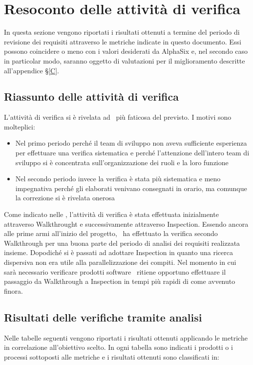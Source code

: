 \newpage
\section{Resoconto delle attività di verifica} \label{B}
In questa sezione vengono riportati i risultati ottenuti a termine del periodo di revisione dei requisiti attraverso le metriche indicate in questo documento. Essi possono coincidere o meno con i valori desiderati da AlphaSix e, nel secondo caso in particolar modo, saranno oggetto di valutazioni per il miglioramento descritte all'appendice \S\ref{C}.

    \subsection{Riassunto delle attività di verifica}
    L'attività di verifica si è rivelata ad \gruppo\ più faticosa del previsto. I motivi sono molteplici:
    	\begin{itemize}
    		\item Nel primo periodo perché il team di sviluppo non aveva sufficiente esperienza per effettuare una verifica sistematica e perché l'attenzione dell'intero team di sviluppo si è concentrata sull'organizzazione dei ruoli e la loro funzione
    		\item Nel secondo periodo invece la verifica è stata più sistematica e meno impegnativa perché gli elaborati venivano consegnati in orario, ma comunque la correzione si è rivelata onerosa
    	\end{itemize}
    

    Come indicato nelle \NdPd, l'attività di verifica è stata effettuata inizialmente attraverso Walkthrought e successivamente attraverso Inspection. Essendo ancora alle prime armi all'inizio del progetto, \gruppo\ ha effettuato la verifica secondo Walkthrough per una buona parte del periodo di analisi dei requisiti realizzata insieme. Dopodiché si è passati ad adottare Inspection in quanto una ricerca dispersiva non era utile alla parallelizzazione dei compiti. 
    Nel momento in cui sarà necessario verificare prodotti software \gruppo\ ritiene opportuno effettuare il passaggio da Walkthrough a Inspection in tempi più rapidi di come avvenuto finora.
    
    \subsection{Risultati delle verifiche tramite analisi}
    Nelle tabelle seguenti vengono riportati i risultati ottenuti applicando le metriche in correlazione all'obiettivo scelto. 
    In ogni tabella sono indicati i prodotti o i processi sottoposti alle metriche e i risultati ottenuti sono classificati in:
    
